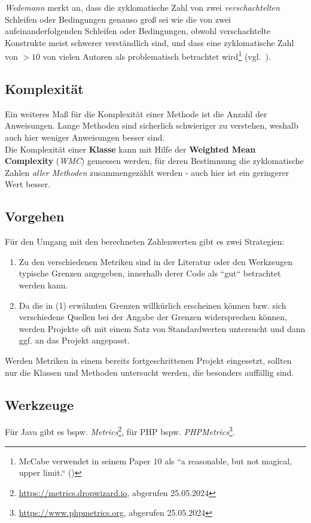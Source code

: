 \noindent
\textit{Wedemann} merkt an, dass die zyklomatische Zahl von zwei \textit{verschachtelten} Schleifen oder Bedingungen genauso groß sei wie die von zwei aufeinanderfolgenden Schleifen oder Bedingungen, obwohl verschachtelte Konstrukte meist schwerer verständlich sind, und dass eine zyklomatische Zahl von $>10$ von vielen Autoren als problematisch betrachtet wird\footnote{
McCabe verwendet in seinem Paper $10$ als ``a reasonable, but not magical,  upper limit.`` (\cite[314]{McC76})
} (vgl.~\cite[38]{Wed09c}).


\subsection*{Komplexität}
Ein weiteres Maß für die Komplexität einer Methode ist die Anzahl der Anweisungen.
Lange Methoden sind sicherlich schwieriger zu verstehen, weshalb auch hier weniger Anweisungen besser sind.\\
Die Komplexität einer \textbf{Klasse} kann mit Hilfe der \textbf{Weighted Mean Complexity} (\textit{WMC}) gemessen werden, für deren Bestimmung die zyklomatische Zahlen \textit{aller Methoden} zusammengezählt werden - auch hier ist ein geringerer Wert besser.

\subsection*{Vorgehen}
Für den Umgang mit den berechneten Zahlenwerten gibt es zwei Strategien:

\begin{enumerate}
    \item Zu den verschiedenen Metriken sind in der Literatur oder den Werkzeugen typische Grenzen angegeben, innerhalb derer Code als ``gut`` betrachtet werden kann.
    \item Da die in (1) erwähnten Grenzen willkürlich erscheinen können bzw. sich verschiedene Quellen bei der Angabe der Grenzen widersprechen können, werden Projekte oft mit einem Satz von Standardwerten untersucht und dann ggf. an das Projekt angepasst.
\end{enumerate}

\noindent
Werden Metriken in einem bereits fortgeschrittenen Projekt eingesetzt, sollten nur die Klassen und Methoden untersucht werden, die besonders auffällig sind.

\subsection*{Werkzeuge}
Für Java gibt es bspw. \textit{Metrics}\footnote{
\url{https://metrics.dropwizard.io}, abgerufen 25.05.2024
}, für PHP bspw. \textit{PHPMetrics}\footnote{
    \url{https://www.phpmetrics.org}, abgerufen 25.05.2024
}.

